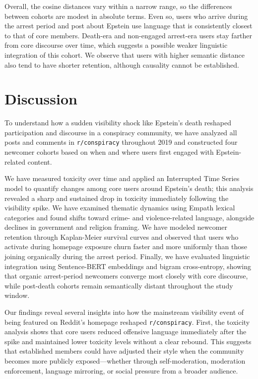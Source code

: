 \documentclass[letterpaper]{article} %
\begin{document}
Overall, the cosine distances vary within a narrow range, so the differences between cohorts are modest in absolute terms.
Even so, users who arrive during the arrest period and post about Epstein use language that is consistently closest to that of core members.
Death-era and non-engaged arrest-era users stay farther from core discourse over time, which suggests a possible weaker linguistic integration of this cohort.
We observe that users with higher semantic distance also tend to have shorter retention, although causality cannot be established.
\section{Discussion}
To understand how a sudden visibility shock like Epstein's death reshaped participation and discourse in a conspiracy community, we have analyzed all posts and comments in \texttt{r/conspiracy} throughout 2019 and constructed four newcomer cohorts based on when and where users first engaged with Epstein-related content. 

We have measured toxicity over time and applied an Interrupted Time Series model to quantify changes among core users around Epstein's death; this analysis revealed a sharp and sustained drop in toxicity immediately following the visibility spike. 
We have examined thematic dynamics using Empath lexical categories and found shifts toward crime- and violence-related language, alongside declines in government and religion framing. 
We have modeled newcomer retention through Kaplan-Meier survival curves and observed that users who activate during homepage exposure churn faster and more uniformly than those joining organically during the arrest period. 
Finally, we have evaluated linguistic integration using Sentence-BERT embeddings and bigram cross-entropy, showing that organic arrest-period newcomers converge most closely with core discourse, while post-death cohorts remain semantically distant throughout the study window.

Our findings reveal several insights into how the mainstream visibility event of being featured on Reddit's homepage reshaped \texttt{r/conspiracy}.
First, the toxicity analysis shows that core users reduced offensive language immediately after the spike and maintained lower toxicity levels without a clear rebound. 
This suggests that established members could have adjusted their style when the community becomes more publicly exposed---whether through self-moderation, moderation enforcement, language mirroring, or social pressure from a broader audience.
\end{document}
